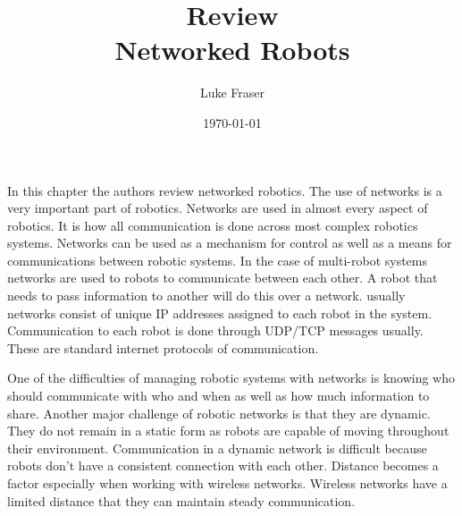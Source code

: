 \documentclass{article}
\begin{document}
\title{{\large Review} \\ Networked Robots}
\author{Luke Fraser}
\date{\today}
\maketitle

\begingroup
\renewcommand{\section}[2]{}


\endgroup

\section*{Summary}
In this chapter the authors review networked robotics. The use of networks is a very important part of robotics. Networks are used in almost every aspect of robotics. It is how all communication is done across most complex robotics systems. Networks can be used as a mechanism for control as well as a means for communications between robotic systems. In the case of multi-robot systems networks are used to robots to communicate between each other. A robot that needs to pass information to another will do this over a network. usually networks consist of unique IP addresses assigned to each robot in the system. Communication to each robot is done through UDP/TCP messages usually. These are standard internet protocols of communication.

One of the difficulties of managing robotic systems with networks is knowing who should communicate with who and when as well as how much information to share. Another major challenge of robotic networks is that they are dynamic. They do not remain in a static form as robots are capable of moving throughout their environment. Communication in a dynamic network is difficult because robots don't have a consistent connection with each other. Distance becomes a factor especially when working with wireless networks. Wireless networks have a limited distance that they can maintain steady communication.
\end{document}
